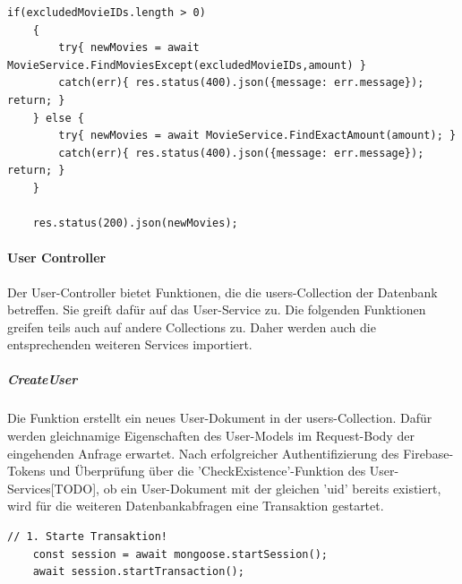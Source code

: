 \begin{lstlisting}[caption=MovieController - RequestMovie - Excluded Movies, label=lst:MovieControllerExcludedMovies]
    if(excludedMovieIDs.length > 0)
    {
        try{ newMovies = await MovieService.FindMoviesExcept(excludedMovieIDs,amount) } 
        catch(err){ res.status(400).json({message: err.message}); return; }
    } else {
        try{ newMovies = await MovieService.FindExactAmount(amount); } 
        catch(err){ res.status(400).json({message: err.message}); return; }
    }

    res.status(200).json(newMovies);
\end{lstlisting}




%
%



\paragraph{User Controller}
Der User-Controller bietet Funktionen, die die users-Collection der Datenbank betreffen. Sie greift dafür auf das User-Service zu. Die folgenden Funktionen greifen teils auch auf andere Collections zu. Daher werden auch die entsprechenden weiteren Services importiert.

\noindent
\subparagraph{CreateUser}
Die Funktion erstellt ein neues User-Dokument in der users-Collection. Dafür werden gleichnamige Eigenschaften des User-Models im Request-Body der eingehenden Anfrage erwartet. Nach erfolgreicher Authentifizierung des Firebase-Tokens und Überprüfung über die 'CheckExistence'-Funktion des User-Services[TODO], ob ein User-Dokument mit der gleichen 'uid' bereits existiert, wird für die weiteren Datenbankabfragen eine Transaktion gestartet.

\begin{lstlisting}[caption=UserController - Create User - Transaktionsstart, label=lst:UserControllertransaction]
    // 1. Starte Transaktion!
    const session = await mongoose.startSession();
    await session.startTransaction();
\end{lstlisting}

